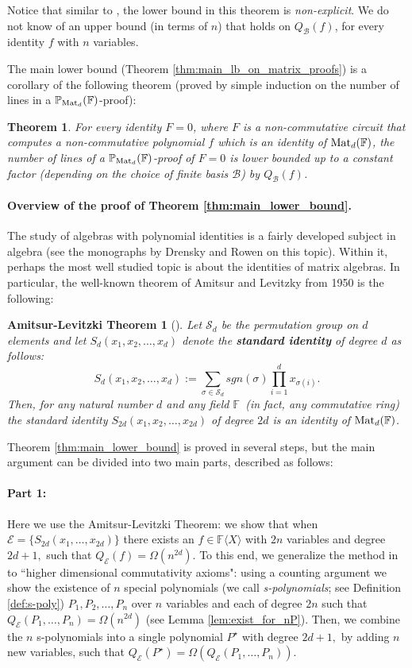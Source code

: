 \documentclass[12pt,reqno]{article}
\newtheorem*{theorem*}{Theorem}
\newtheorem*{A-LThm}{Amitsur-Levitzki Theorem}
\renewcommand{\dot}[1]{{#1}^\star}
\newcommand\F{\ensuremath{\mathbb F}}
\newcommand\PP{{\mathbb P}}
\newcommand\PMd{\ensuremath{\PP_{{\rm Mat}_d}(\F)}}
\newcommand {\para}[1] {\paragraph{#1}}
\newcommand{\matd}{{\ensuremath{{\rm Mat}_d(\F)}}}
\newcommand{\freea}{\ensuremath{\F\langle X\rangle}}
\newcommand{\nx}[1]{#1_1,\ldots,#1_{n}}
\renewcommand{\S}{\mathcal{S}}
\begin{document}
Notice that similar to \cite{Hru11}, the lower bound in this theorem is \emph{non-explicit}.
We  do not know of an upper bound (in terms of $n$) that holds on  $Q_{\mathcal B}(f)$, for every identity  $f$ with \(n\) variables.

The main lower bound (Theorem \ref{thm:main_lb_on_matrix_proofs})  is  a corollary of the following theorem (proved by simple induction on the number of lines in a \PMd-proof):
\begin{theorem*}\label{prop:Pmatd-connection}
For every identity $F=0$, where $F$
is a non-commutative circuit that computes a non-commutative polynomial $f$ which is an identity of \matd, the number of lines of a \PMd-proof of $F=0$ is lower bounded up to a constant factor (depending on the choice of finite basis \(\mathcal B\)) by $Q_{\mathcal B}(f)$.
\end{theorem*}




\para{Overview of the proof of Theorem \ref{thm:main_lower_bound}.}

The study of algebras with polynomial identities is a fairly developed subject in algebra (see the monographs by Drensky \cite{Dre99} and Rowen \cite{Row80} on this topic). Within it, perhaps the most well studied topic is about  the identities of matrix algebras. In particular, the well-known theorem of Amitsur and Levitzky from 1950 \cite{AL50} is the following:

\begin{A-LThm}[\cite{AL50}]
Let $\mathcal S_d$ be the permutation group on $d$ elements and let $S_d(x_1,x_2,\ldots, x_{d})$ denote the \textbf{standard identity} of degree $d$ as follows:
$$S_{d}(x_1,x_2,\ldots, x_{d}):=
        \sum_{\sigma\in \S_{d}}sgn(\sigma)\prod_{i=1}^{d}x_{\sigma(i)}.$$
Then, for any  natural number $d$ and any field \F\ (in fact, any commutative ring) the standard identity  $S_{2d}(x_1,x_2,\ldots, x_{2d})$ of degree $2d$ is an identity of  \matd.
\end{A-LThm}


Theorem \ref{thm:main_lower_bound} is proved in several steps, but the main argument can be divided into two main parts, described as follows: \smallskip\



\para{Part 1:} Here we use the Amitsur-Levitzki Theorem: we show that when $\mathcal  E =\{S_{2d}(x_1,\ldots,x_{2d})\}$  there exists an $f\in\freea$ with $2n$ variables and degree $2d+1,$ such that $Q_\mathcal E(f)=\Omega(n^{2d})$.
To this end, we generalize the method in  \cite{Hru11} to ``higher dimensional commutativity axioms": using a counting argument we show the existence of $n$ special polynomials (we call \textit{s-polynomials}; see Definition \ref{def:s-poly}) $P_1,P_2,\ldots,P_n$ over  $n$ variables and each of degree $2n$ such that $Q_{\mathcal E}(\nx{P})=\Omega(n^{2d})$ (see Lemma \ref{lem:exist_for_nP}). Then, we combine the $n$ s-polynomials into a single polynomial $\dot{P}$ with degree $2d+1,$ by adding $n$ new variables, such that $Q_{\mathcal E}(\dot{P})=\Omega(Q_{\mathcal E}(\nx{P}))$.
\end{document}
